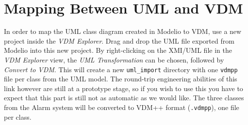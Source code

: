 \section{Mapping Between UML and  VDM}\label{sec:fromUMLtoVDM}\label{sec:syntaxcheck}
\label{sec:typecheck}
In order to map the UML class diagram created in Modelio
to VDM, use a new project inside the \emph{VDM Explorer}. Drag and drop the UML file exported from Modelio into this new project.
By right-clicking on the XMI/UML file in the \emph{VDM Explorer} view, the \emph{UML Transformation} can be chosen, followed by \emph{Convert to VDM}. This will create a new \texttt{uml\_import} directory with one \texttt{vdmpp} file per class from the UML model.
The round-trip engineering abilities of this link however are still at a prototype stage, so if you wish to use this you have to expect that this part is still not as automatic as we would like.  The three classes from the Alarm system will be converted to VDM++ format (\texttt{.vdmpp}), one file per class.



%

